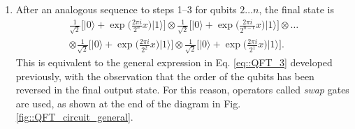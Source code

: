 \documentclass[a4paper]{article}
\begin{document}
\begin{enumerate}
Noting that\footnote{At the end, $x$ is a label for the state and $\{x_1,\ldots,x_n\}\in \{0,1\}$, so this is a binary, i.e. base-2, representation of the label.}
\begin{equation}
x=2^{n-1} x_{1}+2^{n-2} x_{2}+\ldots+ 2^{1} x_{n-1}+2^{0} x_{n},
\end{equation}
the state in Eq. \ref{eq::step3_QFT_circuit} can be written as
\begin{equation}
\frac{1}{\sqrt{2}}\bigg[\vert 0\rangle + \exp{\bigg(\frac{2\pi i }{2^n} x\bigg)}\vert 1\rangle\bigg] \otimes \vert x_2 x_3\ldots x_n\rangle.
\end{equation}
\item After an analogous sequence to steps 1--3 for qubits $2\ldots n$, the final state is
\begin{equation}
\begin{aligned}
\frac{1}{\sqrt{2}}\bigg[\vert 0\rangle + \exp{\bigg(\frac{2\pi i }{2^n} x\bigg)}\vert 1\rangle\bigg] \otimes \frac{1}{\sqrt{2}}\bigg[\vert 0\rangle + \exp{\bigg(\frac{2\pi i }{2^{n-1}} x\bigg)}\vert 1\rangle\bigg] \otimes\ldots\\
\otimes\frac{1}{\sqrt{2}}\bigg[\vert 0\rangle + \exp{\bigg(\frac{2\pi i }{2^2} x\bigg)}\vert 1\rangle\bigg] \otimes \frac{1}{\sqrt{2}}\bigg[\vert 0\rangle + \exp{\bigg(\frac{2\pi i }{2^1} x\bigg)}\vert 1\rangle\bigg].
\end{aligned}
\end{equation}
This is equivalent to the general expression in Eq. \ref{eq::QFT_3} developed previously, with the observation that the order of the qubits has been reversed in the final output state. For this reason, operators called \textit{swap} gates are used, as shown at the end of the diagram in Fig. \ref{fig::QFT_circuit_general}.
\end{enumerate}
\end{document}

